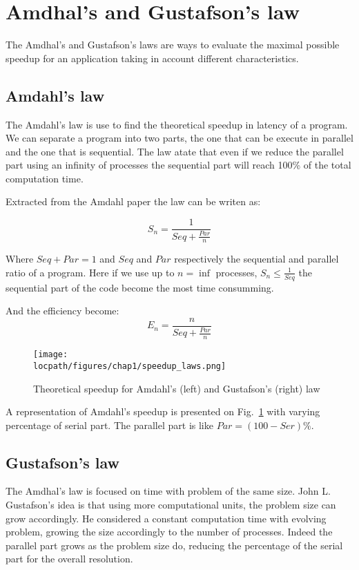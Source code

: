 \section{Amdhal's and Gustafson's law}
The Amdhal's and Gustafson's laws are ways to evaluate the maximal possible speedup for an application taking in account different characteristics. 

\subsection{Amdahl's law}
The Amdahl's law\cite{amdahl1967validity} is use to find the theoretical speedup in latency of a program.
We can separate a program into two parts, the one that can be execute in parallel and the one that is sequential. 
The law atate that even if we reduce the parallel part using an infinity of processes the sequential part will reach 100\% of the total computation time. 

Extracted from the Amdahl paper the law can be writen as: 

\begin{equation}
S_n = \frac{1}{Seq + \frac{Par}{n}}
\end{equation}

Where $Seq + Par = 1$ and $Seq$ and $Par$ respectively the sequential and parallel ratio of a program.
Here if we use up to $n=\inf$ processes, $S_n \leq \frac{1}{Seq}$ the sequential part of the code become the most time consumming. 

And the efficiency become:
\begin{equation}
E_n = \frac{n}{Seq + \frac{Par}{n}}
\end{equation}

\begin{figure}
\texttt{[image: \\locpath/figures/chap1/speedup\_laws.png]}
\caption{Theoretical speedup for Amdahl's (left) and Gustafson's (right) law}
\label{fig:1_HPC:speedup_laws}
\end{figure}

A representation of Amdahl's speedup is presented on Fig.~\ref{fig:1_HPC:speedup_laws} with varying percentage of serial part. 
The parallel part is like $Par = (100-Ser)\%$.

\subsection{Gustafson's law}
The Amdhal's law is focused on time with problem of the same size. 
John L. Gustafson's idea is that using more computational units, the problem size can grow accordingly. 
He considered a constant computation time with evolving problem, growing the size accordingly to the number of processes. 
Indeed the parallel part grows as the problem size do, reducing the percentage of the serial part for the overall resolution.

